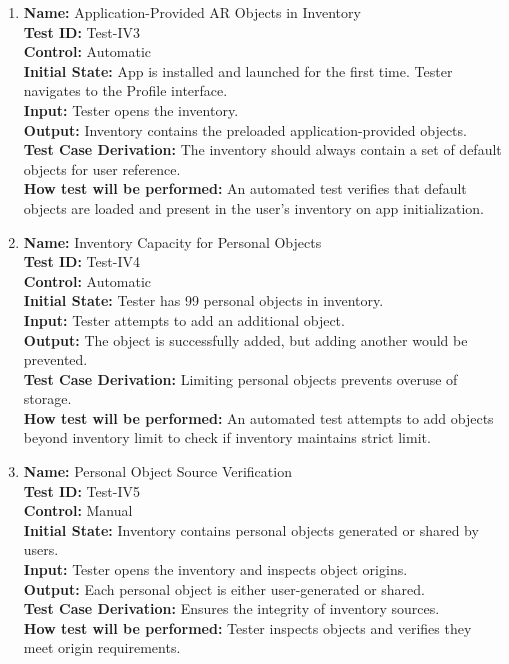 \documentclass[12pt, titlepage]{article}
\begin{document}
\begin{enumerate}
  \item \textbf{Name:} Application-Provided AR Objects in Inventory \label{itm:Test-IV3} \\
        \textbf{Test ID:} Test-IV3 \\
        \textbf{Control:} Automatic \\
        \textbf{Initial State:} App is installed and launched for the first time. Tester navigates to the Profile interface. \\
        \textbf{Input:} Tester opens the inventory. \\
        \textbf{Output:} Inventory contains the preloaded application-provided objects. \\
        \textbf{Test Case Derivation:} The inventory should always contain a set of default objects for user reference. \\
        \textbf{How test will be performed:} An automated test verifies that default objects are loaded and present in the user's inventory on app initialization. \\

  \item \textbf{Name:} Inventory Capacity for Personal Objects \label{itm:Test-IV4} \\
        \textbf{Test ID:} Test-IV4 \\
        \textbf{Control:} Automatic \\
        \textbf{Initial State:} Tester has 99 personal objects in inventory. \\
        \textbf{Input:} Tester attempts to add an additional object. \\
        \textbf{Output:} The object is successfully added, but adding another would be prevented. \\
        \textbf{Test Case Derivation:} Limiting personal objects prevents overuse of storage. \\
        \textbf{How test will be performed:} An automated test attempts to add objects beyond inventory limit to check if inventory maintains strict limit. \\

  \item \textbf{Name:} Personal Object Source Verification \label{itm:Test-IV5} \\
        \textbf{Test ID:} Test-IV5 \\
        \textbf{Control:} Manual \\
        \textbf{Initial State:} Inventory contains personal objects generated or shared by users. \\
        \textbf{Input:} Tester opens the inventory and inspects object origins. \\
        \textbf{Output:} Each personal object is either user-generated or shared. \\
        \textbf{Test Case Derivation:} Ensures the integrity of inventory sources. \\
        \textbf{How test will be performed:} Tester inspects objects and verifies they meet origin requirements. \\


\end{enumerate}
\end{document}
